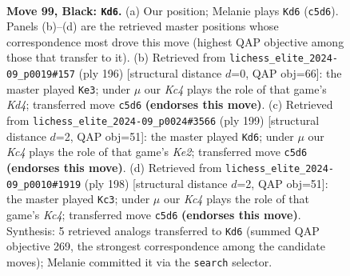 \documentclass[11pt]{article}
\begin{document}
\clearpage

\begin{figure}[p]\centering
\begin{subfigure}{0.46\textwidth}\centering
\resizebox{\linewidth}{!}{%
\newchessgame
\chessboard[
  setfen={2R5/8/8/2k5/7r/r7/5K2/8 b - - 9 99},
  showmover=false,
  pgfstyle=straightmove, color=movearrow, markmove={c5-d6}
]}
\caption{}
\end{subfigure}\hfill
\begin{subfigure}{0.46\textwidth}\centering
\resizebox{\linewidth}{!}{%
\newchessgame
\chessboard[
  setfen={1R6/8/8/k7/3K2r1/8/2R5/8 w - - 17 99},
  showmover=false,
  pgfstyle=straightmove, color=movearrow, markmove={d4-e3}
]}
\caption{}
\end{subfigure}
\\[4pt]
\begin{subfigure}{0.46\textwidth}\centering
\resizebox{\linewidth}{!}{%
\newchessgame
\chessboard[
  setfen={8/R3k3/8/1r6/4K3/8/8/8 b - - 37 100},
  showmover=false,
  pgfstyle=straightmove, color=movearrow, markmove={e7-d6}
]}
\caption{}
\end{subfigure}\hfill
\begin{subfigure}{0.46\textwidth}\centering
\resizebox{\linewidth}{!}{%
\newchessgame
\chessboard[
  setfen={8/5k2/R7/8/2K3r1/8/8/8 w - - 17 100},
  showmover=false,
  pgfstyle=straightmove, color=movearrow, markmove={c4-c3}
]}
\caption{}
\end{subfigure}
\caption{\textbf{Move 99, Black: \texttt{Kd6}.} (a) Our position; Melanie plays \texttt{Kd6} (\texttt{c5d6}). Panels (b)--(d) are the retrieved master positions whose correspondence most drove this move (highest QAP objective among those that transfer to it). (b) Retrieved from \texttt{lichess\_elite\_2024-09\_p0019\#157} (ply 196) [structural distance $d$=0, QAP obj=66]: the master played \texttt{Ke3}; under $\mu$ our \emph{Kc4} plays the role of that game's \emph{Kd4}; transferred move \texttt{c5d6} \textbf{(endorses this move)}. (c) Retrieved from \texttt{lichess\_elite\_2024-09\_p0024\#3566} (ply 199) [structural distance $d$=2, QAP obj=51]: the master played \texttt{Kd6}; under $\mu$ our \emph{Kc4} plays the role of that game's \emph{Ke2}; transferred move \texttt{c5d6} \textbf{(endorses this move)}. (d) Retrieved from \texttt{lichess\_elite\_2024-09\_p0010\#1919} (ply 198) [structural distance $d$=2, QAP obj=51]: the master played \texttt{Kc3}; under $\mu$ our \emph{Kc4} plays the role of that game's \emph{Kc4}; transferred move \texttt{c5d6} \textbf{(endorses this move)}. Synthesis: 5 retrieved analogs transferred to \texttt{Kd6} (summed QAP objective 269, the strongest correspondence among the candidate moves); Melanie committed it via the \texttt{search} selector.}
\label{fig:thought-m197}
\end{figure}
\end{document}
